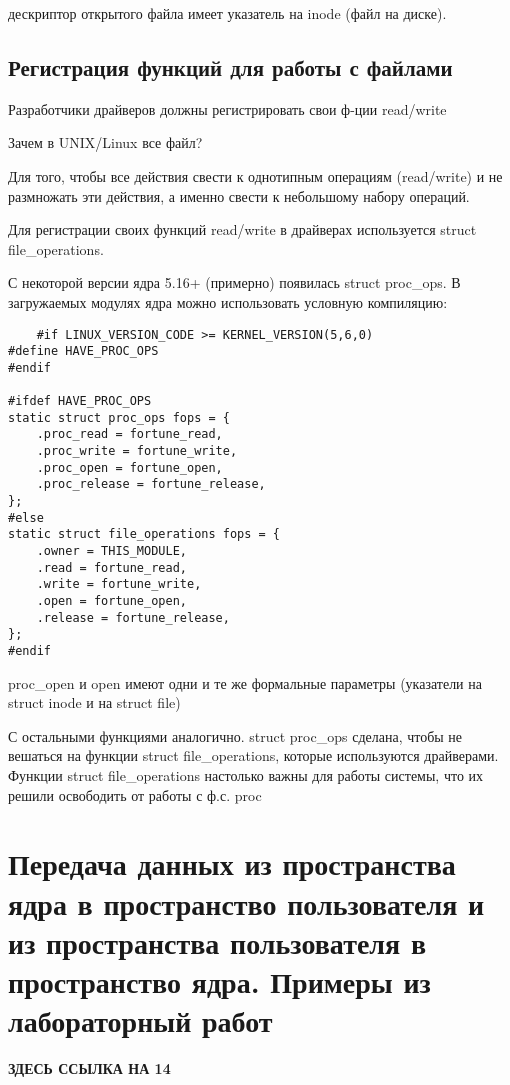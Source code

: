 дескриптор открытого файла имеет указатель на inode (файл на диске).

\subsection{Регистрация функций для работы с файлами}
Разработчики драйверов должны регистрировать свои ф-ции read/write

Зачем в UNIX/Linux все файл?

Для того, чтобы все действия свести к однотипным операциям (read/write) и не размножать эти действия, а именно свести к небольшому набору операций.

Для регистрации своих функций read/write в драйверах используется struct file\_operations.

С некоторой версии ядра 5.16+ (примерно) появилась struct proc\_ops. В загружаемых модулях ядра можно использовать условную компиляцию:

\begin{lstlisting}
    #if LINUX_VERSION_CODE >= KERNEL_VERSION(5,6,0)
#define HAVE_PROC_OPS
#endif

#ifdef HAVE_PROC_OPS
static struct proc_ops fops = {
    .proc_read = fortune_read,
    .proc_write = fortune_write,
    .proc_open = fortune_open,
    .proc_release = fortune_release,
};
#else
static struct file_operations fops = {
    .owner = THIS_MODULE,
    .read = fortune_read,
    .write = fortune_write,
    .open = fortune_open,
    .release = fortune_release,
};
#endif
\end{lstlisting}

proc\_open и open имеют одни и те же формальные параметры (указатели на struct inode и на struct file)

С остальными функциями аналогично. struct proc\_ops сделана, чтобы не вешаться на функции struct file\_operations, которые используются драйверами. Функции struct file\_operations настолько важны для работы системы, что их решили освободить от работы с ф.с. proc 

\section{Передача данных из пространства ядра в пространство пользователя и из пространства пользователя в пространство ядра. Примеры из лабораторный работ}
\textbf{ЗДЕСЬ ССЫЛКА НА 14}